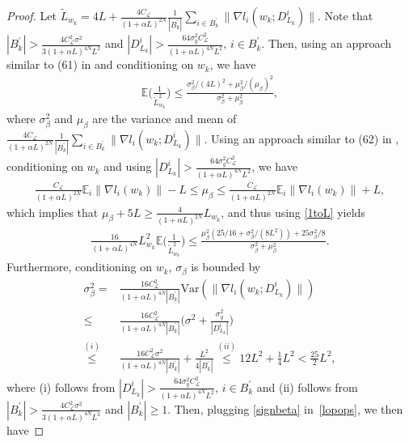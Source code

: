 \documentclass{osudissert96}
\begin{document}
\begin{proof}
	Let $\widetilde L_{w_k} = 4L +\frac{4C_\mathcal{L}}{(1+\alpha L)^{2N}} \frac{1}{|B_k^\prime|}\sum_{i\in B_k^\prime}\|\nabla l_i(w_k;  D_{L_k}^i)\|$. Note that 
	  $|B_k^\prime| > \frac{4C^2_{\mathcal{L}}\sigma^2}{3(1+\alpha L)^{4N}L^2}$ and $|D_{L_k}^i| > \frac{64\sigma^2_g C_\mathcal{L}^2}{(1+\alpha L)^{4N}L^2}, \,i \in B_k^\prime$. Then, using an approach similar to (61) in \cite{fallah2020convergence} and conditioning on $w_k$, we have 
	\begin{align}\label{1toL}
	\mathbb{E} \Big(  \frac{1}{\widetilde L^2_{w_k} }\Big) \leq \frac{\sigma_\beta^2/(4L)^2 + \mu_\beta^2/(\mu_\beta)^2}{\sigma_\beta^2 + \mu_\beta^2},
	\end{align}
	where $\sigma^2_\beta$ and $\mu_\beta$ are the variance and mean of  $\frac{4C_\mathcal{L}}{(1+\alpha L)^{2N}} \frac{1}{|B_k^\prime|}\sum_{i\in B_k^\prime}\|\nabla l_i(w_k; D_{L_k}^i)\|$. Using an approach similar to (62) in \cite{fallah2020convergence}, conditioning on $w_k$ and using $|D_{L_k}^i| > \frac{64\sigma^2_g C_\mathcal{L}^2}{(1+\alpha L)^{4N}L^2}$, we have 
	\begin{align}\label{lluu}
	\frac{C_\mathcal{L}}{(1+\alpha L)^{2N}} \mathbb{E}_i\|\nabla l_i(w_k)\| - L \leq \mu_\beta  \leq \frac{C_\mathcal{L}}{(1+\alpha L)^{2N}} \mathbb{E}_i\|\nabla l_i(w_k)\| + L,
	\end{align}
	which implies that $\mu_\beta +5L \geq \frac{4}{(1+\alpha L)^{2N}}L_{w_k}$, and thus using \cref{1toL} yields
	\begin{align}\label{lopops}
	\frac{16}{(1+\alpha L)^{4N}}L^2_{w_k}	\mathbb{E} \Big(  \frac{1}{\widetilde L^2_{w_k} }\Big) \leq \frac{\mu_\beta^2(25/16+ \sigma_\beta^2/(8L^2))+25\sigma_\beta^2/8}{\sigma_\beta^2 + \mu_\beta^2 }.
	\end{align}
	Furthermore, conditioning on $w_k$,  $\sigma_\beta$ is bounded by 
	\begin{align}\label{signbeta}
	\sigma_\beta^2 =& \frac{16 C^2_\mathcal{L}}{(1+\alpha L)^{4N}|B^\prime_k|} \text{Var} (\|\nabla l_i(w_k; D_{L_k}^i)\|) \nonumber
	\\ \leq & \frac{16 C^2_\mathcal{L}}{(1+\alpha L)^{4N}|B^\prime_k|} \Big(\sigma^2 + \frac{\sigma_g^2}{|D_{L_k}^i|}\Big) \nonumber
	\\\overset{(i)}\leq & \frac{16 C^2_\mathcal{L}\sigma^2}{(1+\alpha L)^{4N}|B^\prime_k|}  + \frac{L^2}{4|B_k^\prime|} \overset{(ii)}\leq  12L^2 + \frac{1}{4}L^2 < \frac{25}{2} L^2,
	\end{align} 
	where (i) follows from $|D_{L_k}^i| > \frac{64\sigma^2_g C_\mathcal{L}^2}{(1+\alpha L)^{4N}L^2}, \,i \in B_k^\prime$ and (ii) follows from $|B_k^\prime| > \frac{4C^2_{\mathcal{L}}\sigma^2}{3(1+\alpha L)^{4N}L^2}$ and $|B_k^\prime| \geq 1$. Then, plugging \cref{signbeta} in~\cref{lopops}, we then have 

\end{proof}
\end{document}
